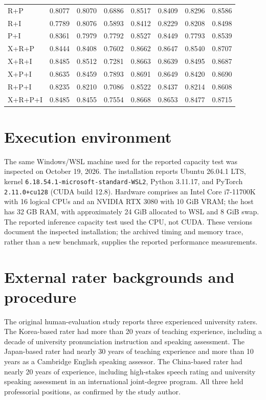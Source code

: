 \documentclass[10pt]{article}
\begin{document}
\begin{longtable}{@{}lrrrrrrr@{}}
R+P & 0.8077 & 0.8070 & 0.6886 & 0.8517 & 0.8409 & 0.8296 & 0.8586 \\
R+I & 0.7789 & 0.8076 & 0.5893 & 0.8412 & 0.8229 & 0.8208 & 0.8498 \\
P+I & 0.8361 & 0.7979 & 0.7792 & 0.8527 & 0.8449 & 0.7793 & 0.8539 \\
X+R+P & 0.8444 & 0.8408 & 0.7602 & 0.8662 & 0.8647 & 0.8540 & 0.8707 \\
X+R+I & 0.8485 & 0.8512 & 0.7281 & 0.8663 & 0.8639 & 0.8495 & 0.8687 \\
X+P+I & 0.8635 & 0.8459 & 0.7893 & 0.8691 & 0.8649 & 0.8420 & 0.8690 \\
R+P+I & 0.8235 & 0.8210 & 0.7086 & 0.8522 & 0.8437 & 0.8214 & 0.8608 \\
X+R+P+I & 0.8485 & 0.8455 & 0.7554 & 0.8668 & 0.8653 & 0.8477 & 0.8715 \\
\midrule
\end{longtable}\endgroup
\section{Execution environment}
The same Windows/WSL machine used for the reported capacity test was inspected on October 19, 2026. The installation reports Ubuntu 26.04.1 LTS, kernel \texttt{6.18.54.1-microsoft-standard-WSL2}, Python 3.11.17, and PyTorch \texttt{2.11.0+cu128} (CUDA build 12.8). Hardware comprises an Intel Core i7-11700K with 16 logical CPUs and an NVIDIA RTX 3080 with 10 GiB VRAM; the host has 32 GB RAM, with approximately 24 GiB allocated to WSL and 8 GiB swap. The reported inference capacity test used the CPU, not CUDA. These versions document the inspected installation; the archived timing and memory trace, rather than a new benchmark, supplies the reported performance measurements.
\section{External rater backgrounds and procedure}
The original human-evaluation study reports three experienced university raters. The Korea-based rater had more than 20 years of teaching experience, including a decade of university pronunciation instruction and speaking assessment. The Japan-based rater had nearly 30 years of teaching experience and more than 10 years as a Cambridge English speaking assessor. The China-based rater had nearly 20 years of experience, including high-stakes speech rating and university speaking assessment in an international joint-degree program. All three held professorial positions, as confirmed by the study author.
\end{document}
